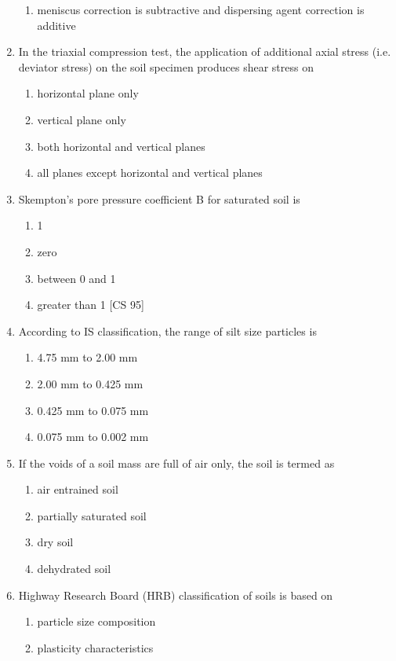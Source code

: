 \documentclass[11pt,a4paper]{article}
\begin{document}
\begin{enumerate}
\begin{enumerate}[label=\Alph*.]
\item{meniscus correction is subtractive and dispersing agent correction is additive}
\end{enumerate}
\item{In the triaxial compression test, the application of additional axial stress (i.e. deviator stress) on the soil specimen produces shear stress on}
\begin{enumerate}[label=\Alph*.]
\item{horizontal plane only}
\item{vertical plane only}
\item{both horizontal and vertical planes}
\item{all planes except horizontal and vertical planes}
\end{enumerate}
\item{Skempton's pore pressure coefficient B for saturated soil is
}
\begin{enumerate}[label=\Alph*.]
\item{1}
\item{zero}
\item{between 0 and 1}
\item{greater than 1 [CS 95]}
\end{enumerate}
\item{According to IS classification, the range of silt size particles is}
\begin{enumerate}[label=\Alph*.]
\item{4.75 mm to 2.00 mm}
\item{2.00 mm to 0.425 mm}
\item{0.425 mm to 0.075 mm}
\item{0.075 mm to 0.002 mm}
\end{enumerate}
\item{If the voids of a soil mass are full of air only, the soil is termed as}
\begin{enumerate}[label=\Alph*.]
\item{air entrained soil}
\item{partially saturated soil}
\item{dry soil}
\item{dehydrated soil}
\end{enumerate}
\item{Highway Research Board (HRB) classification of soils is based on}
\begin{enumerate}[label=\Alph*.]
\item{particle size composition}
\item{plasticity characteristics}

\end{enumerate}
\end{enumerate}
\end{document}
